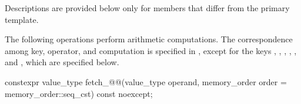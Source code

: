 \pnum
Descriptions are provided below only for members
that differ from the primary template.

\pnum
The following operations perform arithmetic computations.
The correspondence among key, operator, and computation is specified
in ,
except for the keys
,
,
,
,
, and
,
which are specified below.

%
%
%
%
%
%
%
%
\begin{itemdecl}
constexpr value_type fetch_@@(value_type operand,
                          memory_order order = memory_order::seq_cst) const noexcept;
\end{itemdecl}

